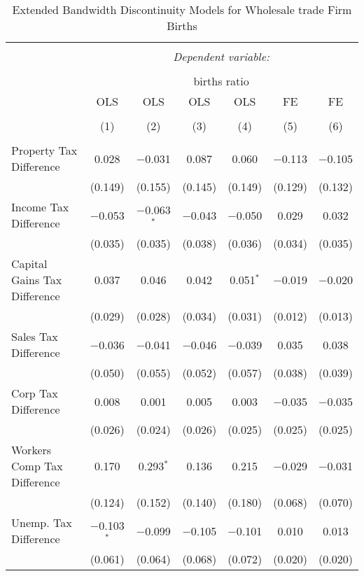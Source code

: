 
\begin{table}[!htbp] \centering 
  \caption{Extended Bandwidth Discontinuity Models for  Wholesale trade Firm Births} 
  \label{42rd} 
\begin{tabular}{@{\extracolsep{5pt}}lcccccc} 
\\[-1.8ex]\hline 
\hline \\[-1.8ex] 
 & \multicolumn{6}{c}{\textit{Dependent variable:}} \\ 
\cline{2-7} 
\\[-1.8ex] & \multicolumn{6}{c}{births ratio} \\ 
 & OLS & OLS & OLS & OLS & FE & FE \\ 
\\[-1.8ex] & (1) & (2) & (3) & (4) & (5) & (6)\\ 
\hline \\[-1.8ex] 
 Property Tax Difference & 0.028 & $-$0.031 & 0.087 & 0.060 & $-$0.113 & $-$0.105 \\ 
  & (0.149) & (0.155) & (0.145) & (0.149) & (0.129) & (0.132) \\ 
  Income Tax Difference & $-$0.053 & $-$0.063$^{*}$ & $-$0.043 & $-$0.050 & 0.029 & 0.032 \\ 
  & (0.035) & (0.035) & (0.038) & (0.036) & (0.034) & (0.035) \\ 
  Capital Gains Tax Difference & 0.037 & 0.046 & 0.042 & 0.051$^{*}$ & $-$0.019 & $-$0.020 \\ 
  & (0.029) & (0.028) & (0.034) & (0.031) & (0.012) & (0.013) \\ 
  Sales Tax Difference & $-$0.036 & $-$0.041 & $-$0.046 & $-$0.039 & 0.035 & 0.038 \\ 
  & (0.050) & (0.055) & (0.052) & (0.057) & (0.038) & (0.039) \\ 
  Corp Tax Difference & 0.008 & 0.001 & 0.005 & 0.003 & $-$0.035 & $-$0.035 \\ 
  & (0.026) & (0.024) & (0.026) & (0.025) & (0.025) & (0.025) \\ 
  Workers Comp Tax Difference & 0.170 & 0.293$^{*}$ & 0.136 & 0.215 & $-$0.029 & $-$0.031 \\ 
  & (0.124) & (0.152) & (0.140) & (0.180) & (0.068) & (0.070) \\ 
  Unemp. Tax Difference & $-$0.103$^{*}$ & $-$0.099 & $-$0.105 & $-$0.101 & 0.010 & 0.013 \\ 
  & (0.061) & (0.064) & (0.068) & (0.072) & (0.020) & (0.020) \\ 

\end{tabular}
\end{table}
